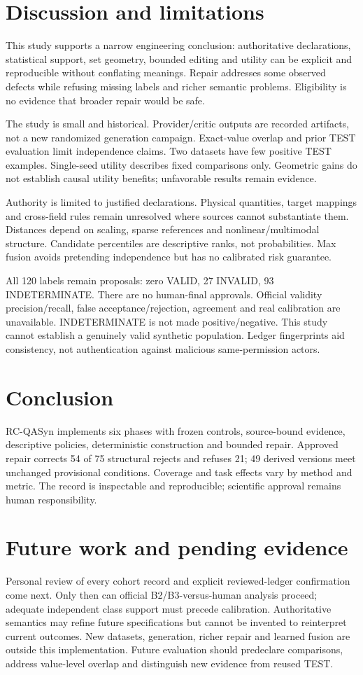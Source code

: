 \section{Discussion and limitations}
This study supports a narrow engineering conclusion: authoritative declarations, statistical support, set geometry, bounded editing and utility can be explicit and reproducible without conflating meanings. Repair addresses some observed defects while refusing missing labels and richer semantic problems. Eligibility is no evidence that broader repair would be safe.

The study is small and historical. Provider/critic outputs are recorded artifacts, not a new randomized generation campaign. Exact-value overlap and prior TEST evaluation limit independence claims. Two datasets have few positive TEST examples. Single-seed utility describes fixed comparisons only. Geometric gains do not establish causal utility benefits; unfavorable results remain evidence.

Authority is limited to justified declarations. Physical quantities, target mappings and cross-field rules remain unresolved where sources cannot substantiate them. Distances depend on scaling, sparse references and nonlinear/multimodal structure. Candidate percentiles are descriptive ranks, not probabilities. Max fusion avoids pretending independence but has no calibrated risk guarantee.

All 120 labels remain proposals: zero VALID, 27 INVALID, 93 INDETERMINATE. There are no human-final approvals. Official validity precision/recall, false acceptance/rejection, agreement and real calibration are unavailable. INDETERMINATE is not made positive/negative. This study cannot establish a genuinely valid synthetic population. Ledger fingerprints aid consistency, not authentication against malicious same-permission actors.

\section{Conclusion}
RC-QASyn implements six phases with frozen controls, source-bound evidence, descriptive policies, deterministic construction and bounded repair. Approved repair corrects 54 of 75 structural rejects and refuses 21; 49 derived versions meet unchanged provisional conditions. Coverage and task effects vary by method and metric. The record is inspectable and reproducible; scientific approval remains human responsibility.

\section{Future work and pending evidence}
Personal review of every cohort record and explicit reviewed-ledger confirmation come next. Only then can official B2/B3-versus-human analysis proceed; adequate independent class support must precede calibration. Authoritative semantics may refine future specifications but cannot be invented to reinterpret current outcomes. New datasets, generation, richer repair and learned fusion are outside this implementation. Future evaluation should predeclare comparisons, address value-level overlap and distinguish new evidence from reused TEST.

